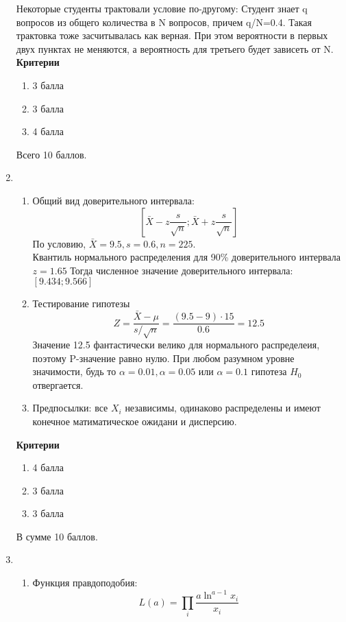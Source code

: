 \documentclass[pdftex,12pt,a4paper]{article}
\begin{document}
\begin{enumerate}
\begin{enumerate}
\end{enumerate}
Некоторые студенты трактовали условие по-другому: Студент знает q вопросов из общего количества в N вопросов, причем  q/N=0.4. Такая трактовка тоже засчитывалась как верная. При этом вероятности в первых двух пунктах не меняются, а вероятность для третьего будет зависеть от N.\\
\textbf{Критерии}
\begin{enumerate}
\item 3 балла
\item 3 балла
\item 4 балла
\end{enumerate}
Всего 10 баллов.
\item 
\begin{enumerate}
\item Общий вид доверительного интервала: 
\begin{equation}
\left[ \bar{X}-z\frac{s}{\sqrt{n}};\bar{X}+z\frac{s}{\sqrt{n}}\right]
\end{equation}
По условию, $\bar{X}=9.5, s=0.6, n=225$.\\
Квантиль нормального распределения для 90\% доверительного интервала $z=1.65$
Тогда численное значение доверительного интервала: $[9.434;9.566]$
\item Тестирование гипотезы\\
\begin{equation}
Z=\frac{\bar{X}-\mu}{s/\sqrt{n}}=\frac{(9.5-9)\cdot 15}{0.6}=12.5
\end{equation}
Значение 12.5 фантастически велико для нормального распределеия, поэтому P-значение равно нулю. При любом разумном уровне значимости, будь то $\alpha=0.01, \alpha=0.05$ или $\alpha=0.1$ гипотеза  $H_0$ отвергается.
\item Предпосылки:
 все $X_i$ независимы, одинаково распределены и имеют конечное матиматическое ожидани и дисперсию.
 \end{enumerate}
 \textbf{Критерии}
 \begin{enumerate}
 \item 4 балла
 \item 3 балла
 \item 3 балла
 \end{enumerate}
 В сумме 10 баллов.
 \item \begin{enumerate}
 \item Функция правдоподобия: 
\begin{equation}
 L(a)=\prod_i \frac{a \ln^{a-1}x_i}{x_i}
\end{equation} 

\end{enumerate}
\end{enumerate}
\end{document}
